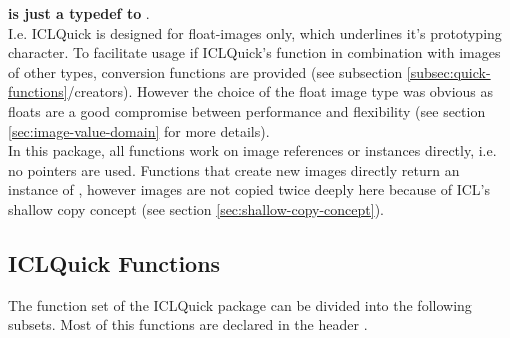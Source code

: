 \textbf{ is just a typedef to }.\\

I.e. ICLQuick is designed for float-images only, which underlines it's prototyping character. To facilitate usage if ICLQuick's function in combination with images of other types, conversion functions are provided (see subsection \ref{subsec:quick-functions}/creators). However the choice of the float image type was obvious as floats are a good compromise between performance and flexibility (see section \ref{sec:image-value-domain} for more details).\\
In this package, all functions work on image references or instances directly, i.e. no pointers are used. Functions that create new images directly return an instance of , however images are not copied twice deeply here because of ICL's shallow copy concept (see section \ref{sec:shallow-copy-concept}).

\subsection{ICLQuick Functions\label{subsec:quick-functions}}
The function set of the ICLQuick package can be divided into the following subsets. Most of this functions are declared in the header .

